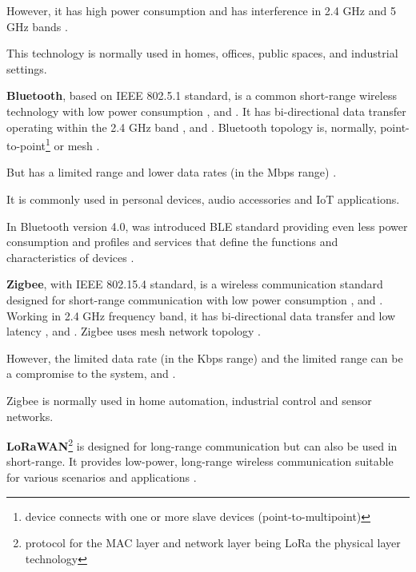 However, it has high power consumption and has interference in 2.4 GHz and 5 GHz bands \cite{WCOM8}.

This technology is normally used in homes, offices, public spaces, and industrial settings.

\textbf{Bluetooth},  based on \gls{IEEE} 802.5.1 standard, is a common short-range wireless technology with low power consumption \cite{WCOM8}, \cite{WCOM11} and \cite{WCOM12}.
It has bi-directional data transfer operating within the 2.4 GHz band \cite{WCOM8}, \cite{WCOM11} and \cite{WCOM12}.
Bluetooth topology is, normally, point-to-point\footnote{device connects with one or more slave devices (point-to-multipoint)} or mesh \cite{WCOM8}.

But has a limited range and lower data rates (in the Mbps range) \cite{WCOM8}.

It is commonly used in personal devices, audio accessories and \gls{IoT} applications.

In Bluetooth version 4.0, was introduced \gls{BLE} standard providing even less power consumption and profiles and services that define the functions and characteristics of devices \cite{WCOM8}.

\textbf{Zigbee}, with \gls{IEEE} 802.15.4 standard, is a wireless communication standard designed for short-range communication with low power consumption \cite{WCOM8}, \cite{WCOM11} and \cite{WCOM12}.
Working in 2.4 GHz frequency band, it has bi-directional data transfer and low latency \cite{WCOM8}, \cite{WCOM11} and \cite{WCOM12}.
Zigbee uses mesh network topology \cite{WCOM8}.

However, the limited data rate (in the Kbps range) and the limited range can be a compromise to the system, \cite{WCOM11} and \cite{WCOM12}.

Zigbee is normally used in home automation, industrial control and sensor networks.

\textbf{\gls{LoRaWAN}}\footnote{protocol for the MAC layer and network layer being LoRa the physical layer technology} is designed for long-range communication but can also be used in short-range.
It provides low-power, long-range wireless communication suitable for various scenarios and applications \cite{WCOM8}.

